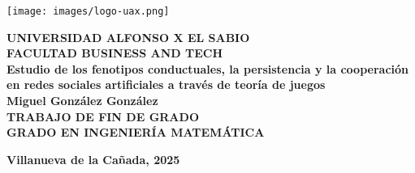 \documentclass[a4paper,12pt]{report}
\begin{document}
\justifying
\begin{titlepage}
    \thispagestyle{empty} %
    \begin{center}
    \centering
    \vspace*{-3cm} %
    \texttt{[image: images/logo-uax.png]} %
    \vspace{1cm}

    {\Large \textbf{UNIVERSIDAD ALFONSO X EL SABIO}} \\[0.5cm] %
    {\large \textbf{FACULTAD BUSINESS AND TECH}} \\[1cm] %

    {\LARGE \textbf{Estudio de los fenotipos conductuales, la persistencia y la cooperación en redes sociales artificiales a través de teoría de juegos} } \\[1cm] %

    {\large \textbf{Miguel González González}} \\[3 cm]

    {\Large \textbf{TRABAJO DE FIN DE GRADO}} \\[0.5cm]
    {\Large \textbf{GRADO EN INGENIERÍA MATEMÁTICA}}
    

    \vfill %
    \textbf{Villanueva de la Cañada, 2025} \\

    \vspace*{1cm}
    \end{center}
\end{titlepage}
\newpage
\end{document}

